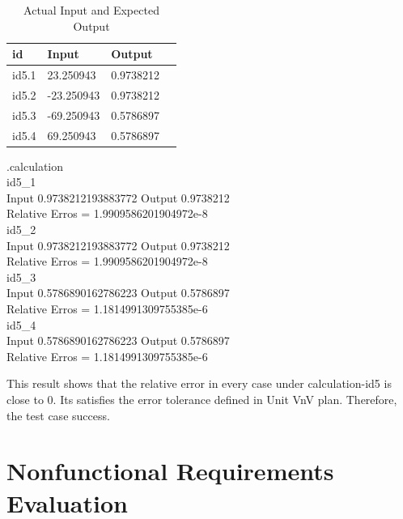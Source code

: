 \documentclass[12pt, titlepage]{article}
\begin{document}
\begin{enumerate}
\begin{table}[h!]
\centering
\noindent \begin{tabular}{l l l l} 
    \toprule		
    \textbf{id} & \textbf{Input} & \textbf{Output}\\ 
	\midrule
   id5.1 &  23.250943  & 0.9738212\\
   id5.2 & -23.250943  & 0.9738212\\
   id5.3 & -69.250943  & 0.5786897\\
   id5.4 &  69.250943  & 0.5786897\\
    \bottomrule
  \end{tabular}
\caption{Actual Input and Expected Output}
\end{table}



\begin{center}
.calculation\\
id5\_1\\
Input 0.9738212193883772 Output 0.9738212 \\
Relative Erros = 1.9909586201904972e-8\\
id5\_2\\
Input 0.9738212193883772 Output 0.9738212 \\
Relative Erros = 1.9909586201904972e-8\\
id5\_3\\
Input 0.5786890162786223 Output 0.5786897 \\
Relative Erros = 1.1814991309755385e-6\\
id5\_4\\
Input 0.5786890162786223 Output 0.5786897 \\
Relative Erros = 1.1814991309755385e-6\\
\end{center}

This result shows that the relative error in every case under calculation-id5 is close to 0.
Its satisfies the error tolerance defined in Unit VnV plan. Therefore, the test case success.

\end{enumerate}
\section{Nonfunctional Requirements Evaluation}
\end{document}
